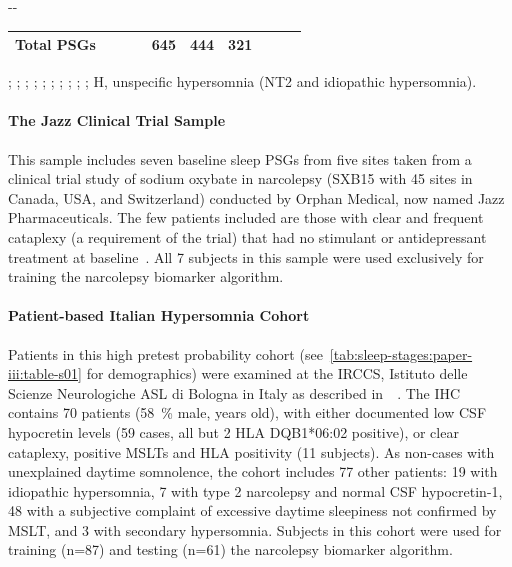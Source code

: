 \begin{table}[tb]
\begin{adjustwidth*}{}{-\marginparwidth-\marginparsep}
\begin{threeparttable}
\begin{tabular}{@{}lccccccccc@{}}
    Total \acp{PSG} & & & & 645                  & 444          & 321         &          & \\ \bottomrule%
\end{tabular}
\begin{tablenotes}
\footnotesize
\item %
; %
; %
; %
; %
; %
; %
; %
; %
; %
; %
H, unspecific hypersomnia (\ac{NT2} and idiopathic hypersomnia).
\end{tablenotes}
\end{threeparttable}
\end{adjustwidth*}
\end{table}

\paragraph{The Jazz Clinical Trial Sample}
This sample includes seven baseline sleep \acp{PSG} from five sites taken from a clinical trial study of sodium oxybate in narcolepsy (SXB15 with 45 sites in Canada, USA, and Switzerland) conducted by Orphan Medical, now named Jazz Pharmaceuticals.
The few patients included are those with clear and frequent cataplexy (a requirement of the trial) that had no stimulant or antidepressant treatment at baseline~\cite{InternationalXyremStudyGroup2005}.
All 7 subjects in this sample were used exclusively for training the narcolepsy biomarker algorithm.

\paragraph{Patient-based Italian Hypersomnia Cohort}
Patients in this high pretest probability cohort (see~\cref{tab:sleep-stages:paper-iii:table-s01} for demographics) were examined at the IRCCS, Istituto delle Scienze Neurologiche ASL di Bologna in Italy as described in~\citeauthor{Pizza2015}~\cite{Pizza2015}.
The IHC contains 70 \ntI patients (\SI{58}{\percent} male,  years old), with either documented low CSF hypocretin levels (59 cases, all but 2 HLA DQB1*06:02 positive), or clear cataplexy, positive MSLTs and HLA positivity (11 subjects).
As non-\ntI cases with unexplained daytime somnolence, the cohort includes 77 other patients: 19 with idiopathic hypersomnia, 7 with type 2 narcolepsy and normal CSF hypocretin-1, 48 with a subjective complaint of excessive daytime sleepiness not confirmed by MSLT, and 3 with secondary hypersomnia.
Subjects in this cohort were used for training (n=87) and testing (n=61) the narcolepsy biomarker algorithm. 

